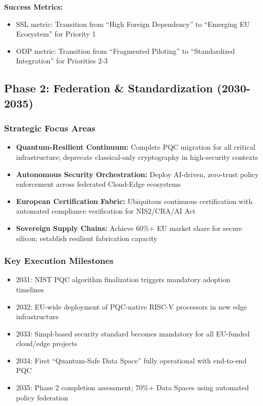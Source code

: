 \documentclass[12pt,a4paper]{article}
\begin{document}
\textbf{Success Metrics:}
\begin{itemize}
    \item SSL metric: Transition from ``High Foreign Dependency''  to ``Emerging EU Ecosystem''  for Priority 1
    \item ODP metric: Transition from ``Fragmented Piloting''  to ``Standardized Integration''  for Priorities 2-3
\end{itemize}

\subsection*{Phase 2: Federation \& Standardization (2030-2035)}

\subsubsection*{Strategic Focus Areas}
\begin{itemize}
    \item \textbf{Quantum-Resilient Continuum:} Complete PQC migration for all critical infrastructure; deprecate classical-only cryptography in high-security contexts
    \item \textbf{Autonomous Security Orchestration:} Deploy AI-driven, zero-trust policy enforcement across federated Cloud-Edge ecosystems
    \item \textbf{European Certification Fabric:} Ubiquitous continuous certification with automated compliance verification for NIS2/CRA/AI Act
    \item \textbf{Sovereign Supply Chains:} Achieve 60\%+ EU market share for secure silicon; establish resilient fabrication capacity
\end{itemize}

\subsubsection*{Key Execution Milestones}
\begin{itemize}
    \item 2031: NIST PQC algorithm finalization triggers mandatory adoption timelines
    \item 2032: EU-wide deployment of PQC-native RISC-V processors in new edge infrastructure
    \item 2033: Simpl-based security standard becomes mandatory for all EU-funded cloud/edge projects
    \item 2034: First ``Quantum-Safe Data Space''  fully operational with end-to-end PQC
    \item 2035: Phase 2 completion assessment; 70\%+ Data Spaces using automated policy federation
\end{itemize}
\end{document}
